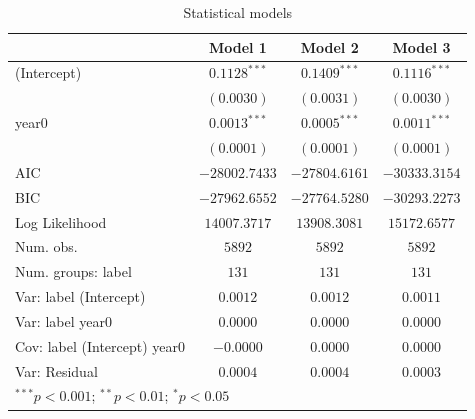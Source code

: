
\begin{table}
\begin{center}
\begin{tabular}{l c c c}
\hline
 & Model 1 & Model 2 & Model 3 \\
\hline
(Intercept)                  & $0.1128^{***}$ & $0.1409^{***}$ & $0.1116^{***}$ \\
                             & $(0.0030)$     & $(0.0031)$     & $(0.0030)$     \\
year0                        & $0.0013^{***}$ & $0.0005^{***}$ & $0.0011^{***}$ \\
                             & $(0.0001)$     & $(0.0001)$     & $(0.0001)$     \\
\hline
AIC                          & $-28002.7433$  & $-27804.6161$  & $-30333.3154$  \\
BIC                          & $-27962.6552$  & $-27764.5280$  & $-30293.2273$  \\
Log Likelihood               & $14007.3717$   & $13908.3081$   & $15172.6577$   \\
Num. obs.                    & $5892$         & $5892$         & $5892$         \\
Num. groups: label           & $131$          & $131$          & $131$          \\
Var: label (Intercept)       & $0.0012$       & $0.0012$       & $0.0011$       \\
Var: label year0             & $0.0000$       & $0.0000$       & $0.0000$       \\
Cov: label (Intercept) year0 & $-0.0000$      & $0.0000$       & $0.0000$       \\
Var: Residual                & $0.0004$       & $0.0004$       & $0.0003$       \\
\hline
\multicolumn{4}{l}{\scriptsize{$^{***}p<0.001$; $^{**}p<0.01$; $^{*}p<0.05$}}
\end{tabular}
\caption{Statistical models}
\label{table:coefficients}
\end{center}
\end{table}
